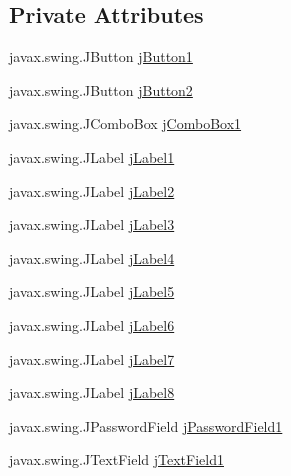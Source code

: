 \subsection*{Private Attributes}
\begin{DoxyCompactItemize}
\item 
javax.\+swing.\+J\+Button \mbox{\hyperlink{class_interfaz_package_1_1_interfaz_registro_a591a9233d6e086496804607414f1ccee}{j\+Button1}}
\item 
javax.\+swing.\+J\+Button \mbox{\hyperlink{class_interfaz_package_1_1_interfaz_registro_aece6fd600c53e99fc2b9de62cfcbc0ae}{j\+Button2}}
\item 
javax.\+swing.\+J\+Combo\+Box \mbox{\hyperlink{class_interfaz_package_1_1_interfaz_registro_a4c0ea8d0c8cbb3225b39b115bbd0416b}{j\+Combo\+Box1}}
\item 
javax.\+swing.\+J\+Label \mbox{\hyperlink{class_interfaz_package_1_1_interfaz_registro_a5e039663e8682c6b2c3cc17dfa6ef899}{j\+Label1}}
\item 
javax.\+swing.\+J\+Label \mbox{\hyperlink{class_interfaz_package_1_1_interfaz_registro_a8b0b7e848f73f459a71f7677741b8171}{j\+Label2}}
\item 
javax.\+swing.\+J\+Label \mbox{\hyperlink{class_interfaz_package_1_1_interfaz_registro_a4189a19af12bde758a673e961e48f7a1}{j\+Label3}}
\item 
javax.\+swing.\+J\+Label \mbox{\hyperlink{class_interfaz_package_1_1_interfaz_registro_a4dda19c10aa23f67ca06e1b8a5a18912}{j\+Label4}}
\item 
javax.\+swing.\+J\+Label \mbox{\hyperlink{class_interfaz_package_1_1_interfaz_registro_a33ae73ec9abbf6e97467d9260b162c3e}{j\+Label5}}
\item 
javax.\+swing.\+J\+Label \mbox{\hyperlink{class_interfaz_package_1_1_interfaz_registro_a49a5d1a1190e2cef3163a9b00fa76108}{j\+Label6}}
\item 
javax.\+swing.\+J\+Label \mbox{\hyperlink{class_interfaz_package_1_1_interfaz_registro_ad54a5088a93694070b1ff7162a917af7}{j\+Label7}}
\item 
javax.\+swing.\+J\+Label \mbox{\hyperlink{class_interfaz_package_1_1_interfaz_registro_ab71462c00d6d77761293a3876adb4447}{j\+Label8}}
\item 
javax.\+swing.\+J\+Password\+Field \mbox{\hyperlink{class_interfaz_package_1_1_interfaz_registro_af5d680c6a043e4e0a96fa3b93ad17cf0}{j\+Password\+Field1}}
\item 
javax.\+swing.\+J\+Text\+Field \mbox{\hyperlink{class_interfaz_package_1_1_interfaz_registro_a19ed9a68b571a55582801c1726af9b06}{j\+Text\+Field1}}

\end{DoxyCompactItemize}
